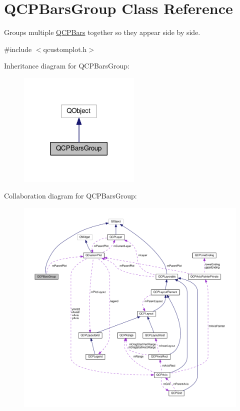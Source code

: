 \hypertarget{classQCPBarsGroup}{}\section{Q\+C\+P\+Bars\+Group Class Reference}
\label{classQCPBarsGroup}


Groups multiple \hyperlink{classQCPBars}{Q\+C\+P\+Bars} together so they appear side by side.  




{\ttfamily \#include $<$qcustomplot.\+h$>$}



Inheritance diagram for Q\+C\+P\+Bars\+Group\+:\nopagebreak
\begin{figure}[H]
\begin{center}
\leavevmode
\includegraphics[width=165pt]{classQCPBarsGroup__inherit__graph}
\end{center}
\end{figure}


Collaboration diagram for Q\+C\+P\+Bars\+Group\+:\nopagebreak
\begin{figure}[H]
\begin{center}
\leavevmode
\includegraphics[width=350pt]{classQCPBarsGroup__coll__graph}
\end{center}
\end{figure}

